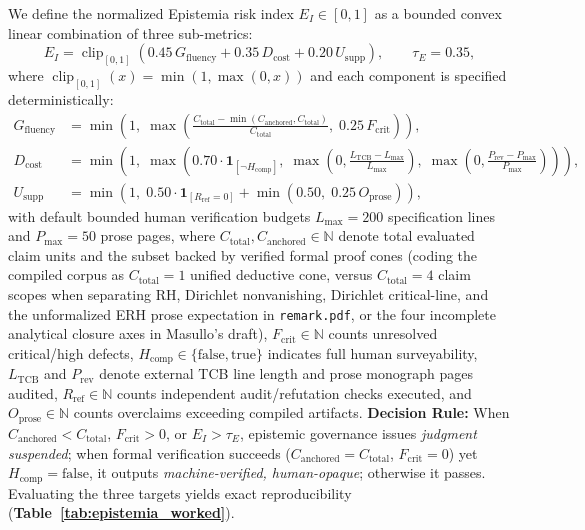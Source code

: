 \documentclass[11pt,a4paper]{article}
\begin{document}
We define the normalized Epistemia risk index $E_I \in [0, 1]$ as a bounded convex linear combination of three sub-metrics:
\begin{equation}
  E_I = \operatorname{clip}_{[0,1]}\!\left(0.45\,G_{\mathrm{fluency}} + 0.35\,D_{\mathrm{cost}} + 0.20\,U_{\mathrm{supp}}\right), \qquad \tau_E = 0.35,
  \label{eq:epistemia}
\end{equation}
where $\operatorname{clip}_{[0,1]}(x) = \min(1, \max(0, x))$ and each component is specified deterministically:
\begin{align}
  G_{\mathrm{fluency}} &= \min\!\left(1,\; \max\!\left(\frac{C_{\mathrm{total}} - \min(C_{\mathrm{anchored}}, C_{\mathrm{total}})}{C_{\mathrm{total}}},\; 0.25\,F_{\mathrm{crit}}\right)\right), \\
  D_{\mathrm{cost}} &= \min\!\left(1,\; \max\!\left(0.70 \cdot \mathbf{1}_{[\neg H_{\mathrm{comp}}]},\; \max\!\left(0,\frac{L_{\mathrm{TCB}}-L_{\max}}{L_{\max}}\right),\; \max\!\left(0,\frac{P_{\mathrm{rev}}-P_{\max}}{P_{\max}}\right)\right)\right), \\
  U_{\mathrm{supp}} &= \min\!\left(1,\; 0.50 \cdot \mathbf{1}_{[R_{\mathrm{ref}}=0]} + \min(0.50,\; 0.25\,O_{\mathrm{prose}})\right),
\end{align}
with default bounded human verification budgets $L_{\max}=200$ specification lines and $P_{\max}=50$ prose pages, where $C_{\mathrm{total}}, C_{\mathrm{anchored}} \in \mathbb{N}$ denote total evaluated claim units and the subset backed by verified formal proof cones (coding the compiled corpus as $C_{\mathrm{total}} = 1$ unified deductive cone, versus $C_{\mathrm{total}} = 4$ claim scopes when separating RH, Dirichlet nonvanishing, Dirichlet critical-line, and the unformalized ERH prose expectation in \texttt{remark.pdf}, or the four incomplete analytical closure axes in Masullo's draft), $F_{\mathrm{crit}} \in \mathbb{N}$ counts unresolved critical/high defects, $H_{\mathrm{comp}} \in \{\mathrm{false},\mathrm{true}\}$ indicates full human surveyability, $L_{\mathrm{TCB}}$ and $P_{\mathrm{rev}}$ denote external TCB line length and prose monograph pages audited, $R_{\mathrm{ref}} \in \mathbb{N}$ counts independent audit/refutation checks executed, and $O_{\mathrm{prose}} \in \mathbb{N}$ counts overclaims exceeding compiled artifacts. \textbf{Decision Rule:} When $C_{\mathrm{anchored}} < C_{\mathrm{total}}$, $F_{\mathrm{crit}} > 0$, or $E_I > \tau_E$, epistemic governance issues \emph{judgment suspended}; when formal verification succeeds ($C_{\mathrm{anchored}} = C_{\mathrm{total}}$, $F_{\mathrm{crit}}=0$) yet $H_{\mathrm{comp}} = \mathrm{false}$, it outputs \emph{machine-verified, human-opaque}; otherwise it passes. Evaluating the three targets yields exact reproducibility (\textbf{Table~\ref{tab:epistemia_worked}}).
\end{document}
